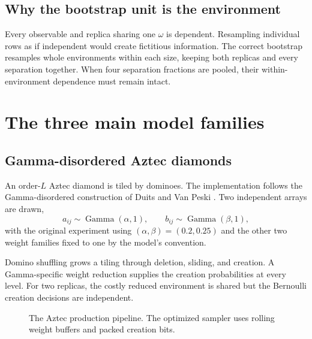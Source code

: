 \documentclass[11pt,a4paper,oneside,openany]{memoir}
\newcommand{\1}{\bm{1}}
\begin{document}
\section{Why the bootstrap unit is the environment}

Every observable and replica sharing one $\omega$ is dependent. Resampling
individual rows as if independent would create fictitious information.
The correct bootstrap resamples whole environments within each size, keeping
both replicas and every separation together. When four separation fractions
are pooled, their within-environment dependence must remain intact.

\chapter{The three main model families}
\label{chap:models}

\section{Gamma-disordered Aztec diamonds}

An order-$L$ Aztec diamond is tiled by dominoes. The implementation follows
the Gamma-disordered construction of Duits and Van Peski
\cite{DuitsVanPeski2025}. Two independent arrays are drawn,
\[
  a_{ij}\sim\operatorname{Gamma}(\alpha,1),\qquad
  b_{ij}\sim\operatorname{Gamma}(\beta,1),
\]
with the original experiment using $(\alpha,\beta)=(0.2,0.25)$ and the other
two weight families fixed to one by the model's convention.

Domino shuffling grows a tiling through deletion, sliding, and creation. A
Gamma-specific weight reduction supplies the creation probabilities at every
level. For two replicas, the costly reduced environment is shared but the
Bernoulli creation decisions are independent.

\begin{figure}[H]
\centering
{}
\caption{The Aztec production pipeline. The optimized sampler uses rolling weight buffers and packed creation bits.}
\end{figure}
\end{document}
